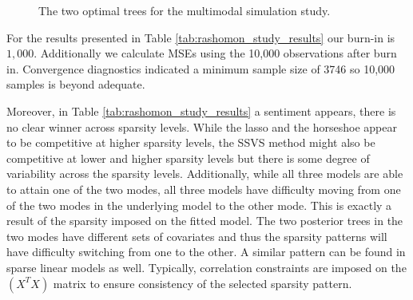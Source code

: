  \begin{figure}
  \begin{center}
\hspace{1cm}
\caption{The two optimal trees for the multimodal simulation study. }
\label{fig:best_two_trees}  
\end{center}
\end{figure}
For the results presented in Table \ref{tab:rashomon_study_results} our burn-in is $1,000$. Additionally we calculate MSEs using the 10,000 observations after burn in. Convergence diagnostics indicated a minimum sample size of 3746 so 10,000 samples is beyond adequate. 
 
Moreover, in Table \ref{tab:rashomon_study_results} a sentiment appears, there is no clear winner across sparsity levels. While the lasso and the horseshoe appear to be competitive at higher sparsity levels, the SSVS method might also be competitive at lower and higher sparsity levels but there is some degree of variability across the sparsity levels. Additionally, while all three models are able to attain one of the two modes, all three models have difficulty moving from one of the two modes in the underlying model to the other mode. This is exactly a result of the sparsity imposed on the fitted model. The two posterior trees in the two modes have different sets of covariates and thus the sparsity patterns will have difficulty switching from one to the other. A similar pattern can be found in sparse linear models as well. Typically, correlation constraints are imposed on the $(X^TX)$ matrix to ensure consistency of the selected sparsity pattern. 

